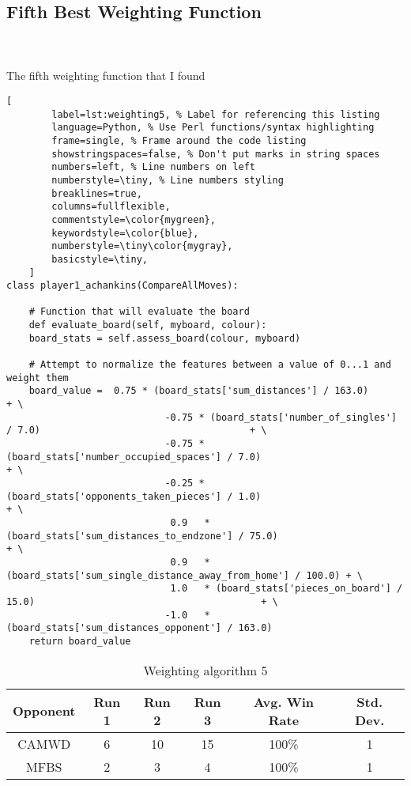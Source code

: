 \documentclass[
	12pt, %
]{fphw}
\begin{document}

\subsection{Fifth Best Weighting Function}

\hfill\\ \\  The fifth weighting function that I found

\begin{lstlisting}[
		label=lst:weighting5, % Label for referencing this listing
		language=Python, % Use Perl functions/syntax highlighting
		frame=single, % Frame around the code listing
		showstringspaces=false, % Don't put marks in string spaces
		numbers=left, % Line numbers on left
		numberstyle=\tiny, % Line numbers styling
		breaklines=true,
		columns=fullflexible,
		commentstyle=\color{mygreen},
		keywordstyle=\color{blue},
		numberstyle=\tiny\color{mygray},
		basicstyle=\tiny,
	]
class player1_achankins(CompareAllMoves):

    # Function that will evaluate the board
    def evaluate_board(self, myboard, colour):
    board_stats = self.assess_board(colour, myboard)

    # Attempt to normalize the features between a value of 0...1 and weight them
    board_value =  0.75 * (board_stats['sum_distances'] / 163.0)                                        + \
                            -0.75 * (board_stats['number_of_singles'] / 7.0)                                     + \
                            -0.75 * (board_stats['number_occupied_spaces'] / 7.0)                          + \
                            -0.25 * (board_stats['opponents_taken_pieces'] / 1.0)                            + \
                             0.9   * (board_stats['sum_distances_to_endzone'] / 75.0)                      + \
                             0.9   * (board_stats['sum_single_distance_away_from_home'] / 100.0) + \
                             1.0   * (board_stats['pieces_on_board'] / 15.0)                                        + \
                            -1.0   * (board_stats['sum_distances_opponent'] / 163.0)
    return board_value
\end{lstlisting}

\begin{table}[ht]
	\centering
	\begin{tabular}{||c | c c c c c||}
		\hline
		Opponent & Run 1&   Run 2 & Run 3 & Avg. Win Rate & Std. Dev. \\ [0.5ex]
		\hline\hline
		CAMWD &  6 & 10 & 15 & 100\% & 1 \\
		\hline
		MFBS & 2 & 3 & 4 & 100\% & 1 \\ [1ex]
		\hline
	\end{tabular}
	\caption{Weighting algorithm 5}
	\label{table:5}
\end{table}
\end{document}
